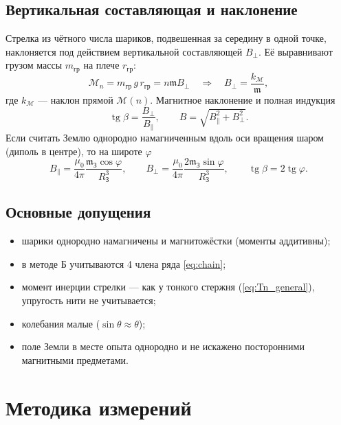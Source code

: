 \documentclass[a4paper,12pt]{article}
\newcommand{\mm}{\mathfrak{m}}
\begin{document}
\subsection{Вертикальная составляющая и наклонение}
Стрелка из чётного числа шариков, подвешенная за середину в одной точке,
наклоняется под действием вертикальной составляющей $B_\perp$. Её
выравнивают грузом массы $m_\text{гр}$ на плече $r_\text{гр}$:
\begin{equation}
    \label{eq:moment}
    \mathcal{M}_n = m_\text{гр}\,g\,r_\text{гр} = n\mm B_\perp
    \quad\Rightarrow\quad
    B_\perp = \frac{k_\mathcal{M}}{\mm},
\end{equation}
где $k_\mathcal{M}$ --- наклон прямой $\mathcal{M}(n)$. Магнитное
наклонение и полная индукция
\begin{equation}
    \label{eq:beta}
    \operatorname{tg}\beta = \frac{B_\perp}{B_\parallel},
    \qquad
    B = \sqrt{B_\parallel^2 + B_\perp^2}.
\end{equation}
Если считать Землю однородно намагниченным вдоль оси вращения шаром
(диполь в центре), то на широте $\varphi$
\begin{equation}
    \label{eq:earth_dipole}
    B_\parallel = \frac{\mu_0}{4\pi}\frac{\mm_\text{З}\cos\varphi}{R_\text{З}^3},
    \qquad
    B_\perp = \frac{\mu_0}{4\pi}\frac{2\mm_\text{З}\sin\varphi}{R_\text{З}^3},
    \qquad
    \operatorname{tg}\beta = 2\operatorname{tg}\varphi.
\end{equation}

\subsection{Основные допущения}
\begin{itemize}
    \item шарики однородно намагничены и магнитожёстки (моменты аддитивны);
    \item в методе Б учитываются 4 члена ряда \cref{eq:chain};
    \item момент инерции стрелки --- как у тонкого стержня
          (\cref{eq:Tn_general}), упругость нити не учитывается;
    \item колебания малые ($\sin\theta\approx\theta$);
    \item поле Земли в месте опыта однородно и не искажено посторонними
          магнитными предметами.
\end{itemize}

\section{Методика измерений}
\end{document}
